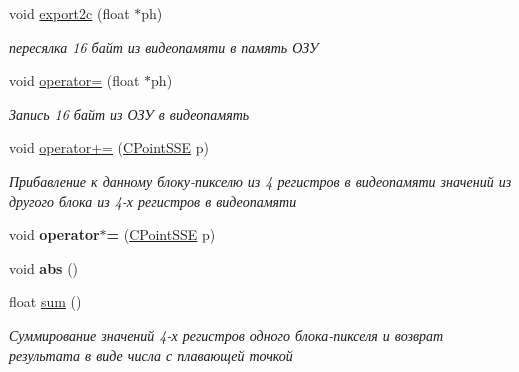 \begin{DoxyCompactItemize}
void \hyperlink{class_c_point_s_s_e_a350aeb352b3d2bc72ca55be04f1efd09}{export2c} (float $\ast$ph)
\begin{DoxyCompactList}\small\item\em пересялка 16 байт из видеопамяти в память ОЗУ \end{DoxyCompactList}\item 
void \hyperlink{class_c_point_s_s_e_a852d887d77c016dd40e8ab17a2b80c08}{operator=} (float $\ast$ph)
\begin{DoxyCompactList}\small\item\em Запись 16 байт из ОЗУ в видеопамять \end{DoxyCompactList}\item 
void \hyperlink{class_c_point_s_s_e_a6ebb1e404c03632ddf217fae1853c61e}{operator+=} (\hyperlink{class_c_point_s_s_e}{C\+Point\+S\+S\+E} p)
\begin{DoxyCompactList}\small\item\em Прибавление к данному блоку-\/пикселю из 4 регистров в видеопамяти значений из другого блока из 4-\/х регистров в видеопамяти \end{DoxyCompactList}\item 
\hypertarget{class_c_point_s_s_e_a49cb91e742db4965d51bc88455ba1ee7}{void {\bfseries operator$\ast$=} (\hyperlink{class_c_point_s_s_e}{C\+Point\+S\+S\+E} p)}\label{class_c_point_s_s_e_a49cb91e742db4965d51bc88455ba1ee7}

\item 
\hypertarget{class_c_point_s_s_e_aea588903399e10259c4f9b9ad5eb26e5}{void {\bfseries abs} ()}\label{class_c_point_s_s_e_aea588903399e10259c4f9b9ad5eb26e5}

\item 
float \hyperlink{class_c_point_s_s_e_af4363118542095ec40ee22933cbb99d6}{sum} ()
\begin{DoxyCompactList}\small\item\em Суммирование значений 4-\/х регистров одного блока-\/пикселя и возврат результата в виде числа с плавающей точкой \end{DoxyCompactList}\end{DoxyCompactItemize}


